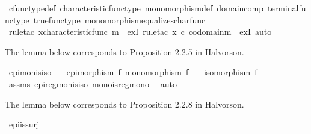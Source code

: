 \begin{isabellebody}
\ cfunc{\isacharunderscore}{\kern0pt}type{\isacharunderscore}{\kern0pt}def\ characteristic{\isacharunderscore}{\kern0pt}func{\isacharunderscore}{\kern0pt}type\ monomorphism{\isacharunderscore}{\kern0pt}def\ domain{\isacharunderscore}{\kern0pt}comp\ terminal{\isacharunderscore}{\kern0pt}func{\isacharunderscore}{\kern0pt}type\ true{\isacharunderscore}{\kern0pt}func{\isacharunderscore}{\kern0pt}type\ monomorphism{\isacharunderscore}{\kern0pt}equalizes{\isacharunderscore}{\kern0pt}char{\isacharunderscore}{\kern0pt}func\isanewline
\ \ \isamarkupfalse%
\ {\isacharparenleft}{\kern0pt}rule{\isacharunderscore}{\kern0pt}tac\ x{\isacharequal}{\kern0pt}{\isachardoublequoteopen}characteristic{\isacharunderscore}{\kern0pt}func\ m{\isachardoublequoteclose}\ \ exI{\isacharcomma}{\kern0pt}\ rule{\isacharunderscore}{\kern0pt}tac\ x{\isacharequal}{\kern0pt}{\isachardoublequoteopen}{\isasymt}\ {\isasymcirc}\isactrlsub c\ {\isasymbeta}\isactrlbsub codomain{\isacharparenleft}{\kern0pt}m{\isacharparenright}{\kern0pt}\isactrlesub {\isachardoublequoteclose}\ \ exI{\isacharcomma}{\kern0pt}\ auto{\isacharparenright}{\kern0pt}%
\endisatagproof
{\isafoldproof}%
%
\isadelimproof
%
\endisadelimproof
%
\begin{isamarkuptext}%
The lemma below corresponds to Proposition 2.2.5 in Halvorson.%
\end{isamarkuptext}\isamarkuptrue%
\isamarkupfalse%
\ epi{\isacharunderscore}{\kern0pt}mon{\isacharunderscore}{\kern0pt}is{\isacharunderscore}{\kern0pt}iso{\isacharcolon}{\kern0pt}\isanewline
\ \ \ {\isachardoublequoteopen}epimorphism\ f{\isachardoublequoteclose}\ {\isachardoublequoteopen}monomorphism\ f{\isachardoublequoteclose}\isanewline
\ \ \ {\isachardoublequoteopen}isomorphism\ f{\isachardoublequoteclose}\isanewline
%
\isadelimproof
\ \ %
\endisadelimproof
%
\isatagproof
{}\isamarkupfalse%
\ assms\ epi{\isacharunderscore}{\kern0pt}regmon{\isacharunderscore}{\kern0pt}is{\isacharunderscore}{\kern0pt}iso\ mono{\isacharunderscore}{\kern0pt}is{\isacharunderscore}{\kern0pt}regmono\ \isamarkupfalse%
\ auto%
\endisatagproof
{\isafoldproof}%
%
\isadelimproof
%
\endisadelimproof
%
\begin{isamarkuptext}%
The lemma below corresponds to Proposition 2.2.8 in Halvorson.%
\end{isamarkuptext}\isamarkuptrue%
\isamarkupfalse%
\ epi{\isacharunderscore}{\kern0pt}is{\isacharunderscore}{\kern0pt}surj{\isacharcolon}{\kern0pt}\isanewline

\end{isabellebody}
